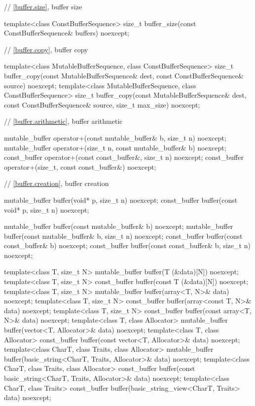 \begin{codeblock}
{  // \ref{buffer.size}, buffer size

  template<class ConstBufferSequence>
    size_t buffer_size(const ConstBufferSequence& buffers) noexcept;

  // \ref{buffer.copy}, buffer copy

  template<class MutableBufferSequence, class ConstBufferSequence>
    size_t buffer_copy(const MutableBufferSequence& dest,
                       const ConstBufferSequence& source) noexcept;
  template<class MutableBufferSequence, class ConstBufferSequence>
    size_t buffer_copy(const MutableBufferSequence& dest,
                       const ConstBufferSequence& source,
                       size_t max_size) noexcept;

  // \ref{buffer.arithmetic}, buffer arithmetic

  mutable_buffer operator+(const mutable_buffer& b, size_t n) noexcept;
  mutable_buffer operator+(size_t n, const mutable_buffer& b) noexcept;
  const_buffer operator+(const const_buffer&, size_t n) noexcept;
  const_buffer operator+(size_t, const const_buffer&) noexcept;

  // \ref{buffer.creation}, buffer creation

  mutable_buffer buffer(void* p, size_t n) noexcept;
  const_buffer buffer(const void* p, size_t n) noexcept;

  mutable_buffer buffer(const mutable_buffer& b) noexcept;
  mutable_buffer buffer(const mutable_buffer& b, size_t n) noexcept;
  const_buffer buffer(const const_buffer& b) noexcept;
  const_buffer buffer(const const_buffer& b, size_t n) noexcept;

  template<class T, size_t N>
    mutable_buffer buffer(T (&data)[N]) noexcept;
  template<class T, size_t N>
    const_buffer buffer(const T (&data)[N]) noexcept;
  template<class T, size_t N>
    mutable_buffer buffer(array<T, N>& data) noexcept;
  template<class T, size_t N>
    const_buffer buffer(array<const T, N>& data) noexcept;
  template<class T, size_t N>
    const_buffer buffer(const array<T, N>& data) noexcept;
  template<class T, class Allocator>
    mutable_buffer buffer(vector<T, Allocator>& data) noexcept;
  template<class T, class Allocator>
    const_buffer buffer(const vector<T, Allocator>& data) noexcept;
  template<class CharT, class Traits, class Allocator>
    mutable_buffer buffer(basic_string<CharT, Traits, Allocator>& data) noexcept;
  template<class CharT, class Traits, class Allocator>
    const_buffer buffer(const basic_string<CharT, Traits, Allocator>& data) noexcept;
  template<class CharT, class Traits>
    const_buffer buffer(basic_string_view<CharT, Traits> data) noexcept;

}
\end{codeblock}

